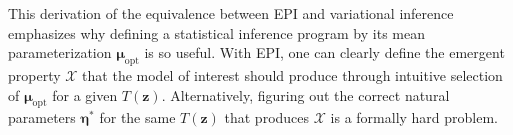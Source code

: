 \documentclass[11pt]{article}
\DeclareMathOperator*{\argmax}{argmax}
\begin{document}
This derivation of the equivalence between EPI and variational inference emphasizes why defining a statistical inference program by its mean parameterization $\bm{\mu}_{\text{opt}}$ is so useful.
With EPI, one can clearly define the emergent property $\mathcal{X}$ that the model of interest should produce through intuitive selection of $\bm{\mu}_{\text{opt}}$ for a given $T(\mathbf{z})$.
Alternatively, figuring out the correct natural parameters $\bm{\eta}^*$ for the same $T(\mathbf{z})$ that produces $\mathcal{X}$ is a formally hard problem.

\end{document}
